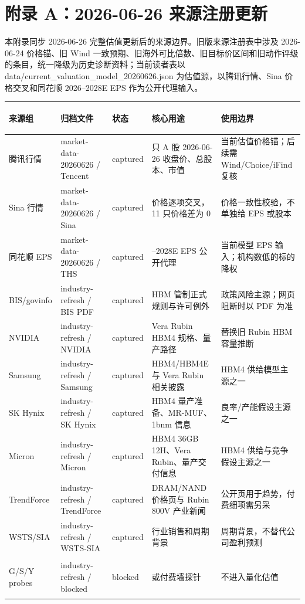 
\section{附录 A：2026-06-26 来源注册更新}

本附录同步 2026-06-26 完整估值更新后的来源边界。旧版来源注册表中涉及 2026-06-24 价格锚、旧 Wind 一致预期、旧海外可比倍数、旧目标价区间和旧动作评级的条目，统一降级为历史诊断资料；当前读者表以 data/current\_valuation\_model\_20260626.json 为估值源，以腾讯行情、Sina 价格交叉和同花顺 2026--2028E EPS 作为公开代理输入。

\begin{exhibitbox}
\centering
\scriptsize
\renewcommand{\arraystretch}{1.24}
\begin{tabularx}{\exhibitboxwidth}{>{\bfseries\raggedright\arraybackslash}p{2.0cm} >{\raggedright\arraybackslash}p{3.1cm} >{\centering\arraybackslash}p{1.25cm} >{\raggedright\arraybackslash}X >{\raggedright\arraybackslash}p{3.0cm}}
\toprule
\textbf{来源组} & \textbf{归档文件} & \textbf{状态} & \textbf{核心用途} & \textbf{使用边界} \\
\midrule
腾讯行情 & market-data-20260626 / Tencent & captured & 11 只 A 股 2026-06-26 收盘价、总股本、市值 & 当前估值价格锚；后续需 Wind/Choice/iFind 复核 \\
Sina 行情 & market-data-20260626 / Sina & captured & 价格逐项交叉，11 只价格差为 0 & 价格一致性校验，不单独给 EPS 或股本 \\
同花顺 EPS & market-data-20260626 / THS & captured & 2026--2028E EPS 公开代理 & 当前模型 EPS 输入；机构数低的标的降权 \\
BIS/govinfo & industry-refresh / BIS PDF & captured & HBM 管制正式规则与许可例外 & 政策风险主源；网页阻断时以 PDF 为准 \\
NVIDIA & industry-refresh / NVIDIA & captured & Vera Rubin HBM4 规格、量产路径 & 替换旧 Rubin HBM 容量推断 \\
Samsung & industry-refresh / Samsung & captured & HBM4/HBM4E 与 Vera Rubin 相关披露 & HBM4 供给模型主源之一 \\
SK Hynix & industry-refresh / SK Hynix & captured & HBM4 量产准备、MR-MUF、1bnm 信息 & 良率/产能假设主源之一 \\
Micron & industry-refresh / Micron & captured & HBM4 36GB 12H、Vera Rubin、量产交付信息 & HBM4 供给与竞争假设主源之一 \\
TrendForce & industry-refresh / TrendForce & captured & DRAM/NAND 价格页与 Rubin 800V 产业新闻 & 公开页用于趋势，付费细项需另采 \\
WSTS/SIA & industry-refresh / WSTS-SIA & captured & 行业销售和周期背景 & 周期背景，不替代公司盈利预测 \\
G/S/Y probes & industry-refresh / blocked & blocked & 403 或付费墙探针 & 不进入量化估值 \\
\bottomrule
\end{tabularx}
\end{exhibitbox}

